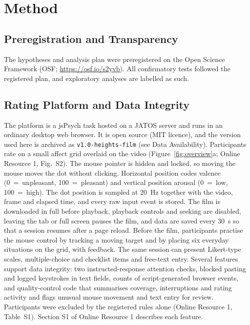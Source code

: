 \documentclass[man,12pt,british]{apa7}
\begin{document}
\section{Method}

\subsection{Preregistration and Transparency}

The hypotheses and analysis plan were preregistered on the Open Science Framework (OSF; \url{https://osf.io/s2yvb}).
All confirmatory tests followed the registered plan, and exploratory analyses are labelled as such.

\subsection{Rating Platform and Data Integrity}

The platform is a jsPsych task \parencite{deleeuw2023jspsych} hosted on a JATOS server \parencite{lange2015jatos}
and runs in an ordinary desktop web browser. It is open source (MIT licence), and the version used here is archived
as \texttt{v1.0-heights-film} (see Data Availability). Participants rate on a small affect grid
\parencite{russell1989affectgrid} overlaid on the video (Figure~\ref{fig:overview}a; Online Resource 1, Fig.~S2).
The mouse pointer is hidden and locked, so moving the mouse moves the dot without clicking. Horizontal position codes
valence (0~=~unpleasant, 100~=~pleasant) and vertical position arousal (0~=~low, 100~=~high). The dot position is
sampled at 20~Hz together with the video, frame and elapsed time, and every raw input event is stored. The film is
downloaded in full before playback, playback controls and seeking are disabled, leaving the tab or full screen pauses
the film, and data are saved every 30~s so that a session resumes after a page reload. Before the film, participants
practise the mouse control by tracking a moving target and by placing six everyday situations on the grid, with
feedback. The same session can present Likert-type scales, multiple-choice and checklist items and free-text entry.
Several features support data integrity: two instructed-response attention checks, blocked pasting and logged
keystrokes in text fields, counts of script-generated browser events, and quality-control code that summarises
coverage, interruptions and rating activity and flags unusual mouse movement and text entry for review. Participants
were excluded by the registered rules alone (Online Resource 1, Table~S1). Section S1 of Online Resource 1 describes
each feature.
\end{document}
